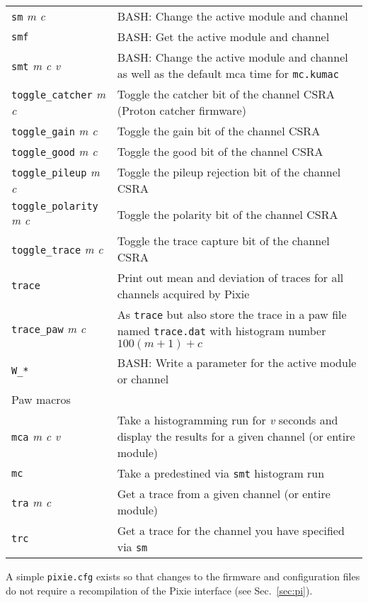 \documentclass[10pt]{article}
\begin{document}
\begin{longtable}{lp{4.5in}}
\texttt{sm} {\it m c} & \textsc{BASH:} Change the active module and channel \\
\texttt{smf} & \textsc{BASH:} Get the active module and channel \\
\texttt{smt} {\it m c v} & \textsc{BASH:} Change the active module and channel as well as the default mca time for \texttt{mc.kumac} \\
\texttt{toggle\_catcher} {\it m c} & Toggle the catcher bit of the channel CSRA (Proton catcher firmware)\\
\texttt{toggle\_gain} {\it m c} & Toggle the gain bit of the channel CSRA\\
\texttt{toggle\_good} {\it m c} & Toggle the good bit of the channel CSRA\\
\texttt{toggle\_pileup} {\it m c} & Toggle the pileup rejection bit of the channel CSRA\\
\texttt{toggle\_polarity} {\it m c} & Toggle the polarity bit of the channel CSRA\\
\texttt{toggle\_trace} {\it m c} & Toggle the trace capture bit of the channel CSRA\\
\texttt{trace} & Print out mean and deviation of traces for all channels acquired by Pixie \\
\texttt{trace\_paw} {\it m c} & As \texttt{trace} but also store the trace in a paw file named \texttt{trace.dat} with histogram number $100(m+1) + c$ \\
\texttt{W\_*} & \textsc{BASH:} Write a parameter for the active module or
channel \\
\hline
Paw macros & \\
\hline
\texttt{mca} {\it m c v} & Take a histogramming run for {\it v} seconds and
display the results for a given channel (or entire module) \\
\texttt{mc}  & Take a predestined via \texttt{smt} histogram run \\
\texttt{tra} {\it m c} & Get a trace from a given channel (or entire module)
\\
\texttt{trc} & Get a trace for the channel you have specified via \texttt{sm} \\
\end{longtable}
A simple \texttt{pixie.cfg} exists so that changes to the firmware and configuration files do not require a recompilation of the Pixie interface (see Sec.~\ref{sec:pi}).
\end{document}
